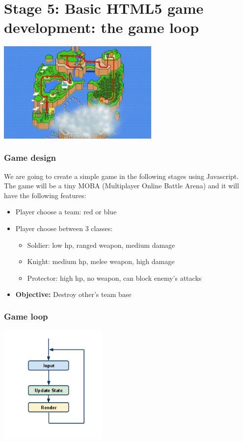 \section{Stage 5: Basic HTML5 game development: the game loop}

\begin{frame}[fragile]
  \begin{center}
    \includegraphics[width=300px]{images/map_stage_5.png}
  \end{center}
\end{frame}

\begin{frame}[fragile]
  \frametitle{Game design}

  We are going to create a simple game in the following stages using Javascript. The game will be a tiny MOBA (Multiplayer Online Battle Arena) and it will have the following features:

  \begin{itemize}
    \pause \item Player choose a team: red or blue
    \pause \item Player choose between 3 classes:
      \begin{itemize}
        \item Soldier: low hp, ranged weapon, medium damage
        \item Knight: medium hp, melee weapon, high damage
        \item Protector: high hp, no weapon, can block enemy's attacks
      \end{itemize}
    \pause \item \textbf{Objective:} Destroy other's team base
  \end{itemize}
\end{frame}

\begin{frame}[fragile]
  \frametitle{Game loop}

  \begin{center}
    \includegraphics[width=200px]{images/game_loop.png}
  \end{center}
\end{frame}

